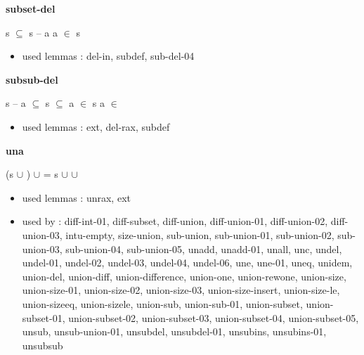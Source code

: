 \documentclass[a4paper]{article}
\begin{document}
\medskip

\bigskip

{\large\bf subset-del}

\medskip

 \Fol s $\subseteq$ s -- a \Equiv \Not a $\in$ s

\begin{itemize}


\item       used lemmas  : del-in, subdef, sub-del-04

\end{itemize}

\medskip

\bigskip

{\large\bf subsub-del}

\medskip

 \Fol s -- a $\subseteq$  \And \Not s $\subseteq$  \And a $\in$ s \Imp \Not a $\in$ 

\begin{itemize}


\item       used lemmas  : ext, del-rax, subdef

\end{itemize}

\medskip

\bigskip

{\large\bf una}

\medskip

 \Fol (s $\cup$ ) $\cup$  = s $\cup$  $\cup$ 

\begin{itemize}


\item       used lemmas  : unrax, ext
\item       used by      : diff-int-01, diff-subset, diff-union, diff-union-01, diff-union-02, diff-union-03, intu-empty, size-union, sub-union, sub-union-01, sub-union-02, sub-union-03, sub-union-04, sub-union-05, unadd, unadd-01, unall, unc, undel, undel-01, undel-02, undel-03, undel-04, undel-06, une, une-01, uneq, unidem, union-del, union-diff, union-difference, union-one, union-rewone, union-size, union-size-01, union-size-02, union-size-03, union-size-insert, union-size-le, union-sizeeq, union-sizele, union-sub, union-sub-01, union-subset, union-subset-01, union-subset-02, union-subset-03, union-subset-04, union-subset-05, unsub, unsub-union-01, unsubdel, unsubdel-01, unsubins, unsubins-01, unsubsub

\end{itemize}
\end{document}
